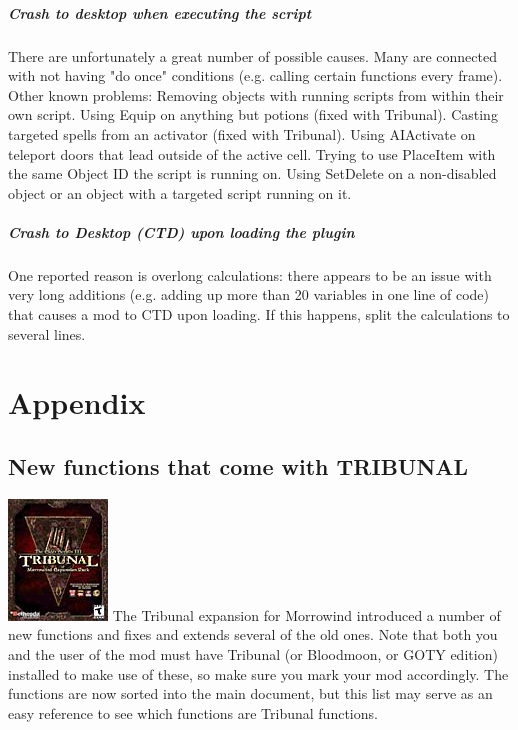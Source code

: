 \documentclass[
]{article}
\begin{document}
\hypertarget{crash-to-desktop-when-executing-the-script}{%
\subparagraph{Crash to desktop when executing the
script}\label{crash-to-desktop-when-executing-the-script}}

There are unfortunately a great number of possible causes. Many are
connected with not having "do once" conditions (e.g. calling certain
functions every frame). Other known problems: Removing objects with
running scripts from within their own script. Using Equip on anything
but potions (fixed with Tribunal). Casting targeted spells from an
activator (fixed with Tribunal). Using AIActivate on teleport doors that
lead outside of the active cell. Trying to use PlaceItem with the same
Object ID the script is running on. Using SetDelete on a non-disabled
object or an object with a targeted script running on it.

\hypertarget{crash-to-desktop-ctd-upon-loading-the-plugin}{%
\subparagraph{\texorpdfstring{Crash to Desktop (CTD) upon loading the
plugin
}{Crash to Desktop (CTD) upon loading the plugin }}\label{crash-to-desktop-ctd-upon-loading-the-plugin}}

One reported reason is overlong calculations: there appears to be an
issue with very long additions (e.g. adding up more than 20 variables in
one line of code) that causes a mod to CTD upon loading. If this
happens, split the calculations to several lines.

\hypertarget{appendix}{%
\section{Appendix}\label{appendix}}

\hypertarget{new-functions-that-come-with-tribunal}{%
\subsection{New functions that come with
TRIBUNAL}\label{new-functions-that-come-with-tribunal}}

\includegraphics{media/image6.png} The Tribunal expansion for Morrowind
introduced a number of new functions and fixes and extends several of
the old ones. Note that both you and the user of the mod must have
Tribunal (or Bloodmoon, or GOTY edition) installed to make use of these,
so make sure you mark your mod accordingly. The functions are now sorted
into the main document, but this list may serve as an easy reference to
see which functions are Tribunal functions.
\end{document}
